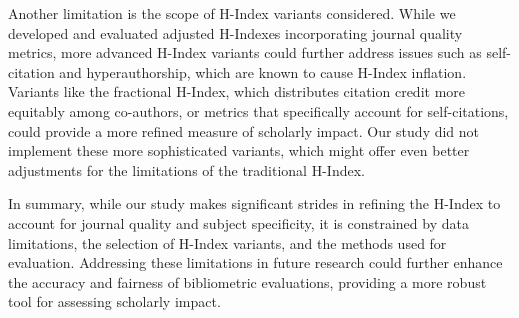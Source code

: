 Another limitation is the scope of H-Index variants considered. While we
developed and evaluated adjusted H-Indexes incorporating journal quality
metrics, more advanced H-Index variants could further address issues such as
self-citation and hyperauthorship, which are known to cause H-Index inflation.
Variants like the fractional H-Index, which distributes citation credit more
equitably among co-authors, or metrics that specifically account for
self-citations, could provide a more refined measure of scholarly impact. Our
study did not implement these more sophisticated variants, which might offer
even better adjustments for the limitations of the traditional H-Index.

In summary, while our study makes significant strides in refining the H-Index
to account for journal quality and subject specificity, it is constrained by
data limitations, the selection of H-Index variants, and the methods used for
evaluation. Addressing these limitations in future research could further
enhance the accuracy and fairness of bibliometric evaluations, providing a more
robust tool for assessing scholarly impact.